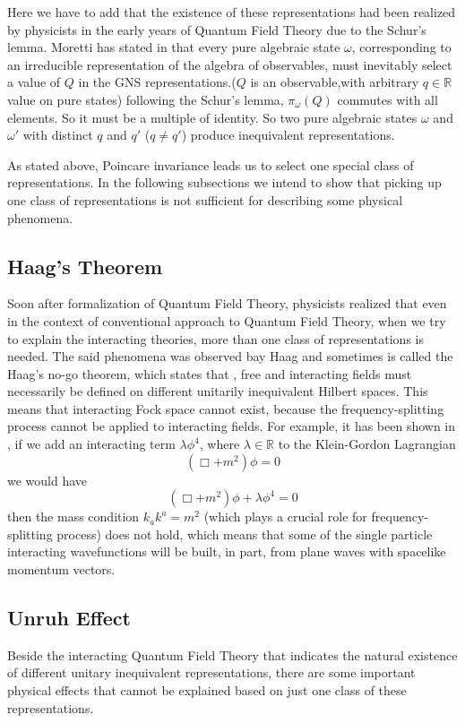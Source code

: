 \documentclass[12pt]{article}
\begin{document}
Here we have to add that the existence of these representations had been realized by physicists in the early years of Quantum Field Theory due to the Schur's lemma. Moretti has stated in \cite{moretti} that every pure algebraic state $\omega$, corresponding to an irreducible representation of the algebra of observables, must inevitably select a value of $Q$ in the GNS representations.($Q$ is an observable,with arbitrary $q\in \mathbb{R}$ value on pure states) following the Schur's lemma, $\pi_{\omega}(Q)$ commutes with all elements. So it must be a multiple of identity. So two pure algebraic states $\omega$ and $\omega'$ with distinct $q$ and $q'$ ($q \neq q'$) produce inequivalent representations.

As stated above, Poincare invariance leads us to select one special class of representations. In the following subsections we intend to show that picking up one class of representations is not sufficient for describing some physical phenomena.


\subsection{Haag's Theorem}
Soon after formalization of Quantum Field Theory, physicists realized that even in the context of conventional approach to Quantum Field Theory, when we try to explain the interacting theories, more than one class of representations is needed.
The said phenomena was observed bay Haag and sometimes is called the Haag's no-go theorem, which states that \cite{HaagArt}, free and interacting fields must necessarily be defined on different unitarily inequivalent Hilbert spaces. This means that interacting Fock space cannot exist, because the frequency-splitting process cannot be applied to interacting fields. For example, it has been shown in \cite{Baker}, if we add an interacting term $\lambda \phi^4$, where $\lambda \in \mathbb{R}$ to the Klein-Gordon Lagrangian 
\begin{equation}\label{KG}
      (\Box + m^2)\phi=0
\end{equation} 
we would have 
\begin{equation}
           (\Box + m^2)\phi+\lambda \phi^4=0
\end{equation} then the mass condition $k_ak^a=m^2$
     (which plays a crucial role for frequency-splitting process) does not hold, which means that some of the single particle interacting wavefunctions will be built, in part, from plane waves with spacelike momentum vectors.
\subsection{Unruh Effect}
Beside the interacting Quantum Field Theory that indicates the natural existence of different unitary inequivalent representations, there are some important physical effects that cannot be explained based on just one class of these representations.
\end{document}
